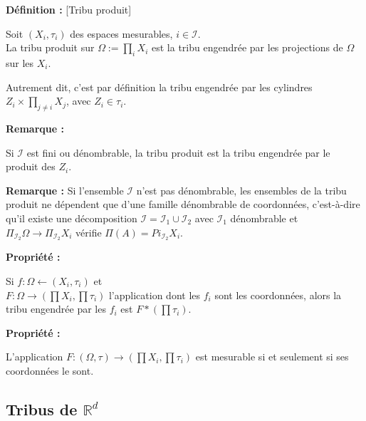 \documentclass[10pt,a4paper,notitlepage ]{report}
\newcommand{\R}{\mathbb R}
\newenvironment{definition}{
	
	\textbf{Définition : }
}
{}
\newcounter{th}
\newenvironment{propriete}[1][]{
	\begin{tcolorbox}
		\textbf{Propriété #1 : }
}
{\end{tcolorbox}}
\newenvironment{rem}{
	
	\textbf{Remarque :}}{}
\begin{document}
\begin{definition}[Tribu produit]

Soit $(X_i , \tau _i )$ des espaces mesurables, $i \in \mathcal{I} $.  \\
La tribu produit sur $\Omega := \prod \limits _i X_i $ est la tribu engendrée par les projections de $\Omega$ sur les $X_i$.

\end{definition}

Autrement dit, c'est par définition la tribu engendrée par les cylindres $Z_i \times \prod \limits_{j \neq i} X_j $, avec $Z_i \in \tau _i $. 

\begin{rem}

Si $\mathcal{I}$ est fini ou dénombrable, la tribu produit est la tribu engendrée par le produit des $Z_i$. 

\end{rem}

\begin{rem}
Si l'ensemble $\mathcal{I} $ n'est pas dénombrable, les ensembles de la tribu produit ne dépendent que d'une famille dénombrable de coordonnées, c'est-à-dire qu'il existe une décomposition 
$\mathcal{I} = \mathcal{I}_1 \cup \mathcal{I}_2 $ 
avec $\mathcal{I}_1 $ dénombrable et 
$\Pi_{ \mathcal{I}_2} \Omega \rightarrow \Pi_{\mathcal{I}_2} X_i $ vérifie 
$\Pi (A) = Pi_{ \mathcal{I}_2} X_i $.
\end{rem}

\begin{propriete}

Si $f : \Omega \longleftarrow (X_i , \tau _i )$ et \\
$ F : \Omega \longrightarrow ( \prod X_i , \prod \tau _i ) $ l'application dont les $f_i$ sont les coordonnées, alors la tribu engendrée par les $f_i$ est $F* (\prod \tau _i ) $.

\end{propriete}

\begin{propriete}

L'application $F : ( \Omega , \tau ) \longrightarrow ( \prod X_i , \prod \tau_i ) $ est mesurable si et seulement si ses coordonnées le sont.

\end{propriete}


\subsection{Tribus de $\R ^d$}
\end{document}
